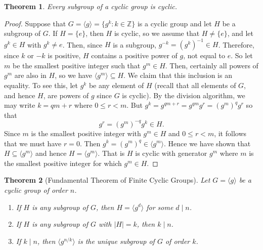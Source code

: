 \documentclass[11pt]{article}
\newcommand{\Z} {{\mathbb Z}}
\newcommand{\divides}{\ensuremath{\mid}}
\newcommand{\<}{\ensuremath{\langle}}
\renewcommand{\>}{\ensuremath{\rangle}}
\newcommand{\eye}{\ensuremath{e}}
\theoremstyle{plain}
\newtheorem{thm}{Theorem}%
\theoremstyle{definition}
\begin{document}
\begin{thm}
\label{thm:9}   Every subgroup of a cyclic group is cyclic.
\end{thm}

\begin{proof}
Suppose that $G=\langle g\rangle =\{g^k: k\in \Z\}$ is a cyclic
group and let $H$ be a subgroup of $G$.  If $H=\{\eye\}$, then $H$ is
cyclic, so we assume that $H\ne \{\eye\}$, and let $g^k\in H$ with
$g^k\ne \eye$.  Then, since $H$ is a subgroup, $g^{-k} =
(g^k)^{-1}\in H$.  Therefore, since $k$ or $-k$ is positive,  $H$
contains a positive power of $g$, not equal to \eye.  So let $m$ be
the smallest positive integer such that $g^m\in H$.  Then,
certainly all powers of $g^m$ are also in $H$, so we have $\langle
g^m\rangle \subseteq H$.  We claim that this inclusion is an
equality.  To see this, let $g^k$ be any element of $H$ (recall
that all elements of $G$, and hence $H$, are powers of $g$ since
$G$ is cyclic).  By the division algorithm, we may write $k=qm+r$
where $0\le r<m$.  But $g^k=g^{qm+r}=g^{qm}g^r=(g^m)^qg^r$ so that
$$g^r=(g^m)^{-q}g^k\in H.$$ Since $m$ is the smallest positive
integer with $g^m\in H$ and $0\le r<m$, it follows that we must
have $r=0$.  Then $g^k=(g^m)^q\in \langle g^m\rangle$. Hence we
have shown that $H\subseteq \langle g^m\rangle$ and hence
$H=\langle g^m\rangle$.  That is $H$ is cyclic with generator
$g^m$ where $m$ is the smallest positive integer for which $g^m
\in H$.
\end{proof}

\begin{thm}[Fundamental Theorem of Finite Cyclic Groups]
\label{thm:10}
Let $G=\langle g\rangle$ be a cyclic group of order $n$.
\begin{enumerate}
\item  If $H$ is any subgroup of $G$, then $H=\langle g^d\rangle$ for some $d\divides n$.
\item  If $H$ is any subgroup of $G$ with $|H|=k$, then $k\divides n$.
\item  If $k\divides n$, then $\langle g^{n/k}\rangle$ is the unique subgroup
of $G$ of order $k$.
\end{enumerate}
\end{thm}
\end{document}
